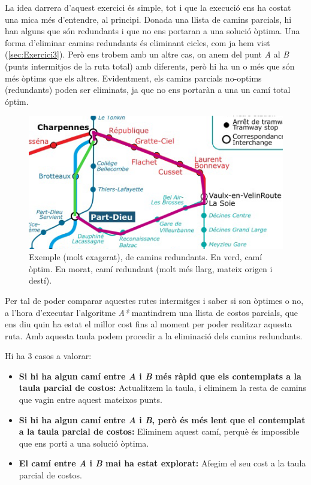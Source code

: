 \documentclass[a4paper,12pt,hidelinks]{article}
\begin{document}
            La idea darrera d’aquest exercici és simple, tot i que la execució ens ha costat una mica més d’entendre, al principi. Donada una llista de camins parcials, hi han alguns que són redundants i que no ens portaran a una solució òptima. Una forma d’eliminar camins redundants és eliminant cicles, com ja hem vist (\ref{sec:Exercici3}). Però ens trobem amb un altre cas, on anem del punt \textit{A} al \textit{B} (punts intermitjos de la ruta total) amb diferents, però hi ha un o més que són més òptims que els altres. Evidentment, els camins parcials no-optims (redundants) poden ser eliminats, ja que no ens portaràn a una un camí total óptim.
            \begin{figure}[h]
                \centering    
                \includegraphics{redundantes.png}
                \caption{Exemple (molt exagerat), de camins redundants. En verd, camí òptim. En morat, camí redundant (molt més llarg, mateix origen i destí).}
            \end{figure}
            
            Per tal de poder comparar aquestes rutes intermitges i saber si son òptimes o no, a l’hora d’executar l’algoritme \textit{A*} mantindrem una llista de costos parcials, que ens diu quin ha estat el millor cost fins al moment per poder realitzar aquesta ruta. Amb aquesta taula podem procedir a la eliminació dels camins redundants.
            
            Hi ha 3 casos a valorar:
            \begin{itemize}
                \item \textbf{Si hi ha algun camí entre \textit{A} i \textit{B} més ràpid que els contemplats a la taula parcial de costos:} Actualitzem la taula, i eliminem la resta de camins que vagin entre aquest mateixos punts.
                \item \textbf{Si hi ha algun camí entre \textit{A} i \textit{B}, però és més lent que el contemplat a la taula parcial de costos:} Eliminem aquest camí, perquè és impossible que ens porti a una solució òptima.
                \item \textbf{El camí entre \textit{A} i \textit{B} mai ha estat explorat:} Afegim el seu cost a la taula parcial de costos.
            \end{itemize}
\end{document}
